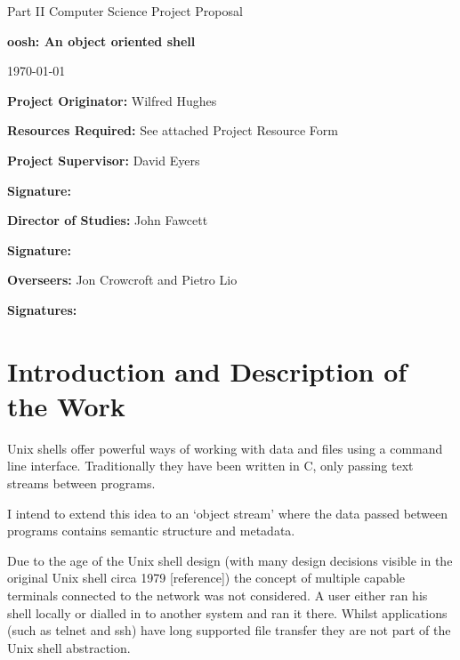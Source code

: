 \documentclass[12pt]{article}
\begin{document}
\thispagestyle{empty}

\medskip
{}
\medskip
{}

\vfil

\centerline{\large Part II Computer Science Project Proposal}
\vspace{0.4in}
\centerline{\Large\bf oosh: An object oriented shell}
\vspace{0.3in}
\centerline{\large \today}

\vfil

{\bf Project Originator:} Wilfred Hughes

\vspace{0.1in}

{\bf Resources Required:} See attached Project Resource Form

\vspace{0.5in}

{\bf Project Supervisor:} David Eyers

\vspace{0.2in}

{\bf Signature:}

\vspace{0.5in}

{\bf Director of Studies:}  John Fawcett

\vspace{0.2in}

{\bf Signature:}

\vspace{0.5in}

{\bf Overseers:} Jon Crowcroft and Pietro Lio

\vspace{0.2in}

{\bf Signatures:}

\vfil
\eject

\section*{Introduction and Description of the Work}
Unix shells offer powerful ways of working with data and files using a
command line interface. Traditionally they have been written in C,
only passing text streams between programs.

I intend to extend this idea to an `object stream' where the data
passed between programs contains semantic structure and metadata. 

Due to the age of the Unix shell design (with many design decisions
visible in the original Unix shell circa 1979 [reference]) the concept
of multiple capable terminals connected to the network was not
considered. A user either ran his shell locally or dialled in to
another system and ran it there. Whilst applications (such as telnet
and ssh) have long supported file transfer they are not part of the
Unix shell abstraction.
\end{document}
